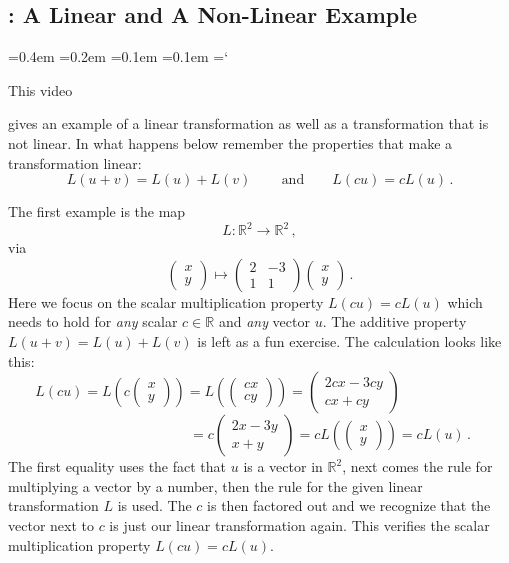 
\subsection{\linTransTitle: A Linear and A Non-Linear Example}

{\ttfamily
{}\font=0.4em
\font=0.2em
\font=0.1em
\font=0.1em
\hyphenchar\font=`\-


\hypertarget{scripts_linear_transformations_example}{This video} gives
an example of  a linear transformation as well as a transformation that
is not linear. In what happens below remember the properties that 
make a transformation linear:
\[
L(u+v)=L(u)+L(v)\, \qquad\mbox{and} \qquad L(cu)=cL(u)\, .
\]


The first example is the map
\[
L:{\mathbb R}^2\longrightarrow {\mathbb R}^2\, ,
\]
via
\[
\begin{pmatrix}
x\\y
\end{pmatrix}
\mapsto 
\begin{pmatrix}
2&-3\\1&1
\end{pmatrix}
\begin{pmatrix}
x\\y
\end{pmatrix}\, .
\]
Here we focus on the scalar multiplication property $L(cu)=cL(u)$ which needs to hold for {\it any} scalar $c\in {\mathbb R}$
and {\it any} vector $u$. The additive property $L(u+v)=L(u)+L(v)$ is left as a fun exercise.
The calculation looks like this:
\[
L(cu)=L\left(c\begin{pmatrix}
x\\y
\end{pmatrix}\right)
=L\left(\begin{pmatrix}
cx\\cy
\end{pmatrix}\right)
=
\begin{pmatrix}
2cx-3cy\\cx+cy
\end{pmatrix}\qquad\qquad\qquad
\]
\[
\qquad\qquad\qquad\qquad\qquad
=
c\begin{pmatrix}
2x-3y\\x+y
\end{pmatrix}
=cL\left(\begin{pmatrix}
x\\y
\end{pmatrix}\right)=cL(u)\, .
\]
The first equality uses the fact that $u$ is a vector in ${\mathbb R}^2$, next comes the
rule for multiplying a vector by a number, then the rule for the given linear transformation $L$ is used.
The $c$ is then factored out and we recognize that the vector next to $c$ is just our linear transformation again.
This verifies the scalar multiplication property $L(cu)=cL(u)$.

}
